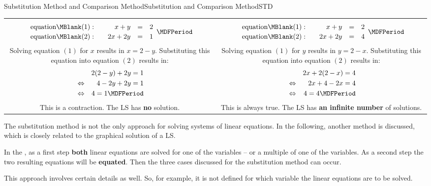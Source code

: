 \begin{MXContent}{Substitution Method and Comparison Method}{Substitution and Comparison Method}{STD}
\begin{MExample}
\begin{center}
\begin{tabular}{c|c}
\begin{minipage}[t]{7.5cm}
$$\begin{array}{rcrcl} \mbox{equation}\MBlank (1): & & x + y & = & 2 \\[.5ex]
\mbox{equation}\MBlank (2): & & 2 x + 2 y & = & 1 \end{array}\MDFPeriod $$
Solving equation $(1)$ for $x$ results in $x = 2 - y$.
Substituting this equation into equation $(2)$ results in:
\begin{eqnarray*}
& & 2 (2 - y) + 2y = 1 \\
& \Leftrightarrow & 4 - 2y + 2y = 1 \\
& \Leftrightarrow & 4 = 1\MDFPeriod 
\end{eqnarray*}
This is a contraction. The LS has \textbf{no} solution.
\end{minipage} &
\begin{minipage}[t]{7.5cm}
$$\begin{array}{rcrcl} \mbox{equation}\MBlank (1): & & x + y & = & 2 \\[.5ex]
\mbox{equation}\MBlank (2): & & 2 x + 2 y & = & 4 \end{array}\MDFPeriod $$
Solving equation $(1)$ for $y$ results in $y = 2 - x$.
Substituting this equation into equation $(2)$ results in:
\begin{eqnarray*}
& & 2x + 2 (2 - x) = 4 \\
& \Leftrightarrow & 2x + 4 - 2x = 4 \\
& \Leftrightarrow & 4 = 4\MDFPeriod 
\end{eqnarray*}
This is always true. The LS has \textbf{an infinite number} of solutions.
\end{minipage}
\end{tabular}
\end{center}
\end{MExample}
The substitution method is not the only approach for solving systems of linear 
equations. In the following, another method is discussed, which is closely related 
to the graphical solution of a LS.

\begin{MInfo}
In the  , as a first step \textbf{both} 
linear equations are solved for one of the variables -- or a multiple of one of 
the variables. As a second step the two resulting equations will be \textbf{equated}. 
Then the three cases discussed for the substitution method can occur. 
\end{MInfo}
This approach involves certain details as well. So, for example, it is not
defined for which variable the linear equations are to be solved.


\end{MXContent}
